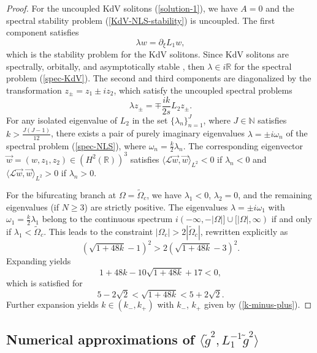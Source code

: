 \documentclass[12pt,reqno]{amsart}
\numberwithin{equation}{section}
\begin{document}
\begin{proof}
For the uncoupled KdV solitons (\ref{solution-1}), we have $A = 0$ and the spectral stability problem (\ref{KdV-NLS-stability}) is uncoupled. 
The first component satisfies 
\begin{equation}
    \label{spec-KdV}
\lambda w = \partial_{\xi} L_1 w,
\end{equation}
which is the stability problem for the KdV solitons. Since KdV solitons are spectrally, orbitally, and asymptotically stable \cite{PW94}, 
then $\lambda \in i \mathbb{R}$ for the spectral problem (\ref{spec-KdV}).
The second and third components are diagonalized by the transformation $z_{\pm} = z_1 \pm i z_2$, which satisfy the uncoupled 
spectral problems 
\begin{equation}
    \label{spec-NLS}
\lambda z_{\pm} = \mp \frac{i k}{2 s} L_2 z_{\pm}.
\end{equation}
For any isolated eigenvalue of $L_2$ in the set $\{ \lambda_n \}_{n=1}^J$,
where $J \in \mathbb{N}$ satisfies $k > \frac{J(J-1)}{12}$, 
there exists a pair of purely imaginary eigenvalues $\lambda = \pm i \omega_n$ 
of the spectral problem (\ref{spec-NLS}), 
where $\omega_n = \frac{k}{2} \lambda_n$. The corresponding eigenvector $\vec{w} = (w,z_1,z_2) \in (H^2(\mathbb{R}))^3$ satisfies $\langle \mathcal{L} \vec{w}, \vec{w} \rangle_{L^2} < 0$ if $\lambda_n < 0$ and $\langle \mathcal{L} \vec{w}, \vec{w} \rangle_{L^2} > 0$ if $\lambda_n > 0$.

For the bifurcating branch at $\Omega = \widetilde{\Omega}_c$, 
we have $\lambda_1 < 0$, $\lambda_2 = 0$, and the remaining eigenvalues (if $N \geq 3$) are strictly positive. The eigenvalues $\lambda = \pm i \omega_1$ 
with $\omega_1 = \frac{k}{2} \lambda_1$ belong to the continuous spectrum $i ( -\infty, -|\Omega|] \cup [|\Omega|,\infty )$ if and only if $\lambda_1 < \widetilde{\Omega}_c$. This leads to the constraint $|\Omega_c| > 2 |\widetilde{\Omega}_c|$, rewritten explicitly as 
$$
(\sqrt{1+48k}-1)^2 > 2 (\sqrt{1+48k}-3)^2.
$$
Expanding yields 
$$
1 + 48 k - 10 \sqrt{1 + 48k} + 17 < 0, 
$$
which is satisfied for 
$$
5 - 2\sqrt{2} < \sqrt{1 + 48 k} < 5 + 2\sqrt{2}. 
$$
Further expansion yields $k \in (k_-,k_+)$ with $k_-$, $k_+$ given by  (\ref{k-minus-plus}). 
\end{proof}


\subsection{Numerical approximations of $\langle \tilde{g}^2, L_1^{-1} \tilde{g}^2 \rangle$}
\end{document}
